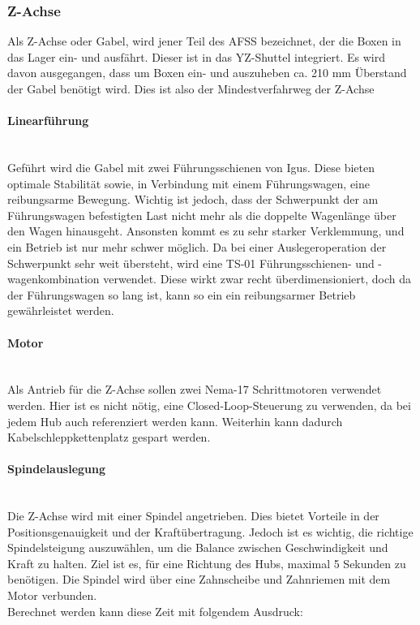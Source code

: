 \subsubsection{Z-Achse}
Als Z-Achse oder Gabel, wird jener Teil des AFSS bezeichnet, der die Boxen in das Lager ein- und ausfährt. Dieser ist in das YZ-Shuttel integriert. Es wird davon ausgegangen, dass um Boxen ein- und auszuheben ca. 210 mm Überstand der Gabel benötigt wird. Dies ist also der Mindestverfahrweg der Z-Achse

\paragraph{Linearführung}\mbox{}\\
Geführt wird die Gabel mit zwei Führungsschienen von Igus. Diese bieten optimale Stabilität sowie, in Verbindung mit einem Führungswagen, eine reibungsarme Bewegung. Wichtig ist jedoch, dass der Schwerpunkt der am Führungswagen befestigten Last nicht mehr als die doppelte Wagenlänge über den Wagen hinausgeht. Ansonsten kommt es zu sehr starker Verklemmung, und ein Betrieb ist nur mehr schwer möglich. Da bei einer Auslegeroperation der Schwerpunkt sehr weit übersteht, wird eine TS-01 Führungsschienen- und -wagenkombination verwendet. Diese wirkt zwar recht überdimensioniert, doch da der Führungswagen so lang ist, kann so ein ein reibungsarmer Betrieb gewährleistet werden.

\paragraph{Motor}\mbox{}\\
Als Antrieb für die Z-Achse sollen zwei Nema-17 Schrittmotoren verwendet werden. Hier ist es nicht nötig, eine Closed-Loop-Steuerung zu verwenden, da bei jedem Hub auch referenziert werden kann. Weiterhin kann dadurch Kabelschleppkettenplatz gespart werden.

\paragraph{Spindelauslegung}\mbox{}\\
Die Z-Achse wird mit einer Spindel angetrieben. Dies bietet Vorteile in der Positionsgenauigkeit und der Kraftübertragung. Jedoch ist es wichtig, die richtige Spindelsteigung auszuwählen, um die Balance zwischen Geschwindigkeit und Kraft zu halten. Ziel ist es, für eine Richtung des Hubs, maximal 5 Sekunden zu benötigen. Die Spindel wird über eine Zahnscheibe und Zahnriemen mit dem Motor verbunden.\\
Berechnet werden kann diese Zeit mit folgendem Ausdruck:

